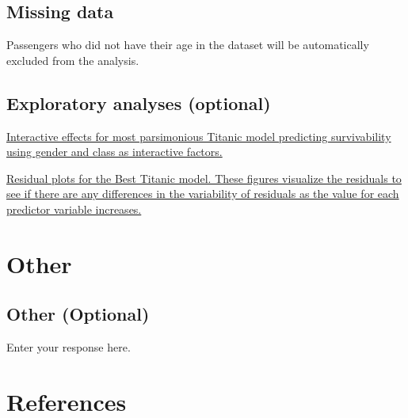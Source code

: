 \documentclass[]{article}
\begin{document}
\hypertarget{missing-data}{%
\subsection{Missing data}\label{missing-data}}

Passengers who did not have their age in the dataset will be
automatically excluded from the analysis.

\hypertarget{exploratory-analyses-optional}{%
\subsection{Exploratory analyses
(optional)}\label{exploratory-analyses-optional}}

\href{InteractiveEffectsPlot.jpg}{Interactive effects for most
parsimonious Titanic model predicting survivability using gender and
class as interactive factors.}

\href{ResidualsPlot.jpg}{Residual plots for the Best Titanic model.
These figures visualize the residuals to see if there are any
differences in the variability of residuals as the value for each
predictor variable increases.}

\hypertarget{other}{%
\section{Other}\label{other}}

\hypertarget{other-optional}{%
\subsection{Other (Optional)}\label{other-optional}}

Enter your response here.

\hypertarget{references}{%
\section{References}\label{references}}

\hypertarget{section}{%
\subsection{}\label{section}}

\vspace{-2pc}
\setlength{\parindent}{-0.5in}
\setlength{\leftskip}{-1in}
\setlength{\parskip}{8pt}

\noindent
\end{document}
